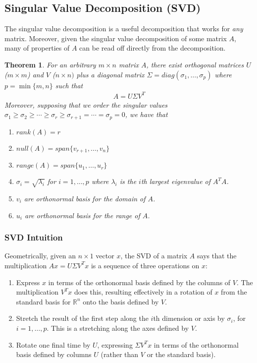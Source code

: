 \documentclass[12pt]{article}
\theoremstyle{plain}
\newtheorem{thm}{Theorem}[section]
\theoremstyle{definition}
\theoremstyle{remark}
\begin{document}
\subsection{Singular Value Decomposition (SVD)}

The singular value decomposition is a useful decomposition that works
for \emph{any} matrix. Moreover, given the singular value decomposition
of some matrix $A$, many of properties of $A$ can be read off directly
from the decomposition.

\begin{thm}
For an arbitrary $m\times n$ matrix $A$, there exist orthogonal matrices
$U$ ($m\times m$) and $V$ ($n\times n)$ plus a diagonal matrix
$\Sigma=diag(\sigma_1, \ldots,\sigma_p)$ where $p=\min\{m,n\}$ such
that
\begin{align*}
  A = U\Sigma V^T
\end{align*}
Moreover, supposing that we order the singular values $\sigma_1 \geq
\sigma_2\geq\cdots\geq \sigma_r\geq \sigma_{r+1}=\cdots = \sigma_p=0$,
we have that
\begin{enumerate}
\item $rank(A)=r$
\item $null(A)=span\{v_{r+1},\ldots,v_n\}$
\item $range(A)=span\{u_{1},\ldots,u_r\}$
\item $\sigma_i = \sqrt{\lambda_i}$ for $i=1,\ldots,p$ where $\lambda_i$
  is the $i$th largest eigenvalue of $A^TA$.
\item $v_i$ are orthonormal basis for the domain of $A$.
\item $u_i$ are orthonormal basis for the range of $A$.
\end{enumerate}
\end{thm}

\subsubsection{SVD Intuition}

Geometrically, given an $n\times 1$ vector $x$, the SVD of a matrix $A$
says that the multiplication $Ax = U\Sigma V^T x$ is a sequence of three
operations on $x$:
\begin{enumerate}
\item Express $x$ in terms of the orthonormal basis defined by the
  columns of $V$. The multiplication $V^T x$ does this, resulting
  effectively in a rotation of $x$ from the standard basis for
  $\mathbb{R}^n$ onto the basis defined by $V$.
\item Stretch the result of the first step along the $i$th dimension or
  axis by $\sigma_i$, for $i=1,\ldots,p$. This is a stretching along the
  axes defined by $V$.
\item Rotate one final time by $U$, expressing $\Sigma V^Tx$ in terms of
  the orthonormal basis defined by columns $U$ (rather than $V$ or the
  standard basis).
\end{enumerate}



\end{document}
